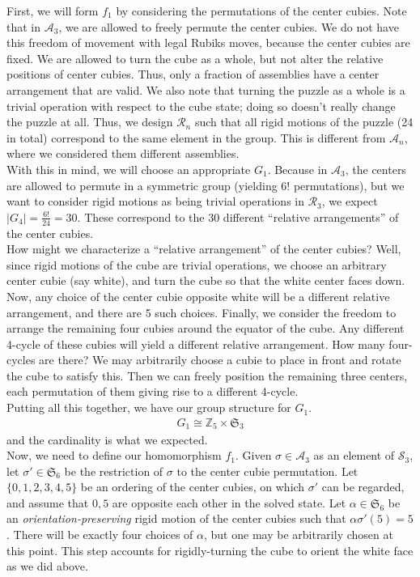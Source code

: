\documentclass[10pt,letterpaper]{report}
\begin{document}
First, we will form $f_1$ by considering the permutations of the center cubies.  Note that in $\mathcal{A}_3$, we are allowed to freely permute the center cubies.  We do not have this freedom of movement with legal Rubiks moves, because the center cubies are fixed.  We are allowed to turn the cube as a whole, but not alter the relative positions of center cubies.  Thus, only a fraction of assemblies have a center arrangement that are valid.  We also note that turning the puzzle as a whole is a trivial operation with respect to the cube state; doing so doesn't really change the puzzle at all.  Thus, we design $\mathcal{R}_n$ such that all rigid motions of the puzzle (24 in total) correspond to the same element in the group.  This is different from $\mathcal{A}_n$, where we considered them different assemblies. \\

With this in mind, we will choose an appropriate $G_1$.  Because in $\mathcal{A}_3$, the centers are allowed to permute in a symmetric group (yielding $6!$ permutations), but we want to consider rigid motions as being trivial operations in $\mathcal{R}_3$, we expect $|G_4| = \frac{6!}{24} = 30$.  These correspond to the 30 different ``relative arrangements'' of the center cubies. \\

How might we characterize a ``relative arrangement'' of the center cubies?  Well, since rigid motions of the cube are trivial operations, we choose an arbitrary center cubie (say white), and turn the cube so that the white center faces down.  Now, any choice of the center cubie opposite white will be a different relative arrangement, and there are 5 such choices.  Finally, we consider the freedom to arrange the remaining four cubies around the equator of the cube.  Any different 4-cycle of these cubies will yield a different relative arrangement.  How many four-cycles are there?  We may arbitrarily choose a cubie to place in front and rotate the cube to satisfy this.  Then we can freely position the remaining three centers, each permutation of them giving rise to a different 4-cycle. \\

Putting all this together, we have our group structure for $G_1$. \begin{align*}
G_1 \cong \mathbb{Z}_5 \times \mathfrak{S}_3
\end{align*}
and the cardinality is what we expected.   \\

Now, we need to define our homomorphism $f_1$.  Given $\sigma \in \mathcal{A}_3$ as an element of $\mathcal{S}_3$, let $\sigma' \in \mathfrak{S}_6$ be the restriction of $\sigma$ to the center cubie permutation.  Let $\{0,1,2,3,4,5\}$ be an ordering of the center cubies, on which $\sigma'$ can be regarded, and assume that $0,5$ are opposite each other in the solved state.  Let $\alpha \in \mathfrak{S}_6$ be an \textit{orientation-preserving} rigid motion of the center cubies such that $\alpha \sigma' (5) = 5$.  There will be exactly four choices of $\alpha$, but one may be arbitrarily chosen at this point.  This step accounts for rigidly-turning the cube to orient the white face as we did above. \\
\end{document}
